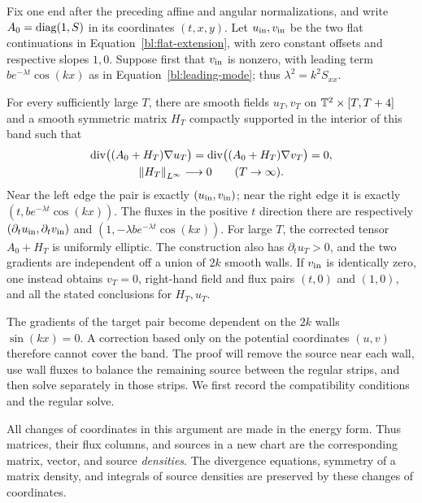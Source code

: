 \begin{lemma}\label{bl:end-matching}
Fix one end after the preceding affine and angular normalizations, and
write $A_0=\operatorname{diag}(1,S)$ in its coordinates $(t,x,y)$.  Let
$u_{\rm in},v_{\rm in}$ be the two flat continuations in
Equation~\eqref{bl:flat-extension}, with zero constant offsets and
respective slopes $1,0$.  Suppose first that $v_{\rm in}$ is nonzero,
with leading term $b e^{-\lambda t}\cos(kx)$ as in
Equation~\eqref{bl:leading-mode}; thus $\lambda^2=k^2S_{xx}$.

For every sufficiently large $T$, there are smooth fields $u_T,v_T$ on
$\mathbb T^2\times[T,T+4]$ and a smooth symmetric matrix $H_T$ compactly
supported in the interior of this band such that
\begin{equation}\label{bl:end-matching-equations}
 \begin{gathered}
 \operatorname{div}\bigl((A_0+H_T)\nabla u_T\bigr)=
 \operatorname{div}\bigl((A_0+H_T)\nabla v_T\bigr)=0,\\
 \left\lVert H_T\right\rVert_{L^\infty}\longrightarrow0\qquad(T\to\infty).
 \end{gathered}
\end{equation}
Near the left edge the pair is exactly $(u_{\rm in},v_{\rm in})$;
near the right edge it is exactly $(t,b e^{-\lambda t}\cos(kx))$.
The fluxes in the positive $t$ direction there are respectively
$(\partial_tu_{\rm in},\partial_tv_{\rm in})$ and
$(1,-\lambda b e^{-\lambda t}\cos(kx))$.  For large $T$, the corrected
tensor $A_0+H_T$ is uniformly elliptic.  The construction also has
$\partial_tu_T>0$, and the two gradients are independent off a union
of $2k$ smooth walls.  If $v_{\rm in}$ is identically zero, one instead
obtains $v_T=0$, right-hand field and flux pairs $(t,0)$ and $(1,0)$,
and all the stated conclusions for $H_T,u_T$.
\end{lemma}

The gradients of the target pair become dependent on the $2k$ walls
$\sin(kx)=0$.  A correction based only on the potential coordinates
$(u,v)$ therefore cannot cover the band.  The proof will remove the
source near each wall, use wall fluxes to balance the remaining source
between the regular strips, and then solve separately in those strips.
We first record the compatibility conditions and the regular solve.

All changes of coordinates in this argument are made in the energy
form.  Thus matrices, their flux columns, and sources in a new chart
are the corresponding matrix, vector, and source \emph{densities}.
The divergence equations, symmetry of a matrix density, and integrals
of source densities are preserved by these changes of coordinates.


